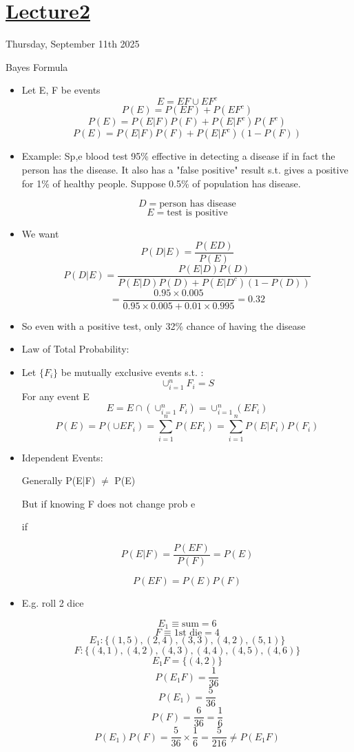 \section[Lecture2]{\hyperlink{toc}{Lecture2}}

Thursday, September 11th 2025

Bayes Formula
\begin{itemize}
      \item Let E, F be events
            \[ E = EF \cup EF^c \]
            \[ P(E) = P(EF) + P(EF^c)\]
            \[ P(E) = P(E|F)P(F) + P(E|F^c)P(F^c)\]
            \[ P(E) = P(E|F)P(F) + P(E|F^c)(1 - P(F))\]
      \item Example: Sp,e blood test 95\% effective in detecting a disease if in fact the person has the disease. It also has a "false positive" result s.t. gives a positive for 1\% of healthy people. Suppose 0.5\% of population has disease.

            \[ D = \text{person has disease}\]
            \[ E = \text{test is positive}\]

      \item We want
            \[ P(D|E) = \frac{P(ED)}{P(E)}\]
            \[ P(D|E) = \frac{P(E|D)P(D)}{P(E|D)P(D) + P(E|D^c)(1 - P(D))}\]
            \[ = \frac{0.95 \times 0.005}{0.95 \times 0.005 + 0.01 \times 0.995} = 0.32\]
      \item So even with a positive test, only 32\% chance of having the disease
      \item Law of Total Probability:
      \item Let $\{F_i\}$ be mutually exclusive events s.t. :
            \[ \cup^n_{i=1} F_i = S\]
            For any event E
            \[ E = E \cap (\cup^n_{i=1} F_i) = \cup^n_{i=1} (E F_i)\]
            \[ P(E) = P(\cup E F_i) = \sum_{i=1}^n P(E F_i) = \sum_{i=1}^n P(E|F_i)P(F_i)\]

      \item Idependent Events:

            Generally P(E|F) $\neq$ P(E)

            But if knowing F does not change prob e

            if

            \[ P(E|F) = \frac{P(EF)}{P(F)} = P(E)\]

            \[ \boxed{P(EF) = P(E)P(F)} \]


      \item E.g. roll 2 dice

            \[ E_1 \equiv \text{sum} = 6 \]
            \[ F \equiv \text{1st die} = 4 \]
            \[ E_1: \{(1,5), (2,4), (3,3), (4,2), (5,1)\} \]
            \[ F: \{(4,1), (4,2), (4,3), (4,4), (4,5), (4,6)\} \]
            \[ E_1 F = \{(4,2)\} \]
            \[ P(E_1 F) = \frac{1}{36} \]
            \[ P(E_1) = \frac{5}{36} \]
            \[ P(F) = \frac{6}{36}  = \frac{1}{6}\]
            \[ P(E_1 ) P(F) = \frac{5}{36} \times \frac{1}{6} = \frac{5}{216} \neq P(E_1 F)\]


\end{itemize}
